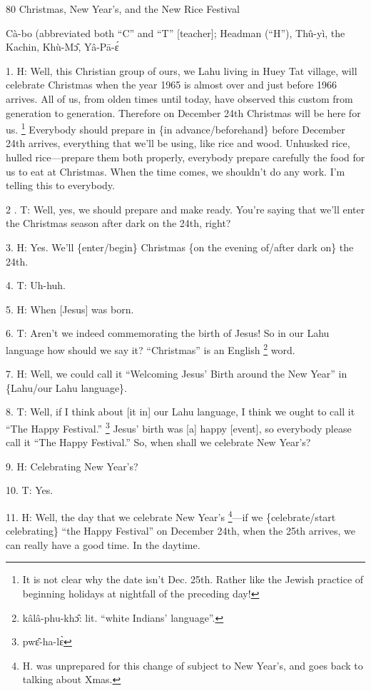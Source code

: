 
80 Christmas, New Year's, and the New Rice Festival

Cà-bo (abbreviated both ``C'' and ``T'' [teacher]; Headman (``H''), Thû-yì,
the Kachin, Khù-Mɔ̂, Yâ-Pā-ɛ́

1. H: Well, this Christian group of ours, we Lahu living in Huey Tat village, will
celebrate Christmas when the year 1965 is almost over and just before 1966 arrives.
All of us, from olden times until today, have observed this custom from generation
to generation.  Therefore on December 24th Christmas will be here for us. \footnote{It is not clear why the date isn't Dec. 25th.  Rather like the Jewish practice of beginning holidays at nightfall of the preceding day!} Everybody
should prepare in \{in advance/beforehand\} before December 24th arrives, everything
that we'll be using, like rice and wood.  Unhusked rice, hulled rice---prepare
them both properly, everybody prepare carefully the food for us to eat at Christmas.
When the time comes, we shouldn't do any work.  I'm telling this to everybody.

2 . T: Well, yes, we should prepare and make ready.  You're saying that we'll enter
the Christmas season after dark on the 24th, right?

3. H: Yes.  We'll \{enter/begin\} Christmas \{on the evening of/after dark on\}
the 24th.

4. T: Uh-huh.

5. H: When [Jesus] was born.

6. T: Aren't we indeed commemorating the birth of Jesus!  So in our Lahu language
how should we say it?  ``Christmas'' is an English \footnote{kâlâ-phu-khɔ̂: lit. ``white Indians' language''.} word.

7. H: Well, we could call it ``Welcoming Jesus' Birth around the New Year'' in
\{Lahu/our Lahu language\}.

8. T: Well, if I think about [it in] our Lahu language, I think we ought to call
it ``The Happy Festival.'' \footnote{pwɛ̂-ha-lɛ̀}  Jesus' birth was [a] happy [event], so everybody
please call it ``The Happy Festival.''  So, when shall we celebrate New Year's?

9. H: Celebrating New Year's?

10. T: Yes.

11. H: Well, the day that we celebrate New Year's \footnote{H. was unprepared for this change of subject to New Year's, and goes back to talking about Xmas.}---if we \{celebrate/start
celebrating\} ``the Happy Festival'' on December 24th, when the 25th arrives, we
can really have a good time.  In the daytime.

